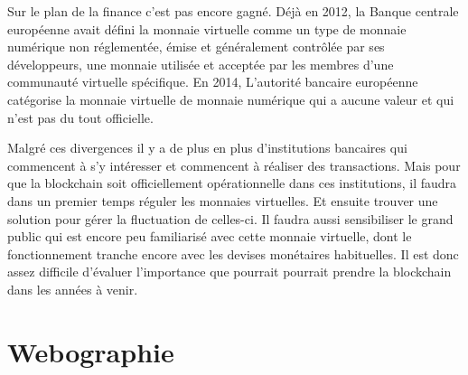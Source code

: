 \documentclass[12pt]{report}
\begin{document}
\hspace{1cm} Sur le plan de la finance c'est pas encore gagné. Déjà en 2012, la Banque centrale européenne avait défini la monnaie virtuelle comme un type de monnaie numérique non réglementée, émise et généralement contrôlée par ses développeurs, une monnaie utilisée et acceptée par les membres d'une communauté virtuelle spécifique. En 2014, L'autorité bancaire européenne catégorise la monnaie virtuelle de monnaie numérique qui a aucune valeur et qui n'est pas du tout officielle.

\hspace{1cm} Malgré ces divergences il y a de plus en plus d'institutions bancaires qui commencent à s'y intéresser et commencent à réaliser des transactions. Mais pour que la blockchain soit officiellement opérationnelle dans ces institutions, il faudra dans un premier temps réguler les monnaies virtuelles. Et ensuite trouver une solution pour gérer la fluctuation de celles-ci. Il faudra aussi sensibiliser le grand public qui est encore peu familiarisé avec cette monnaie virtuelle, dont le fonctionnement tranche encore avec les devises monétaires habituelles. Il est donc assez difficile d’évaluer l’importance que pourrait pourrait prendre la blockchain dans les années à venir.\\

\newpage
\section{Webographie}
\end{document}
